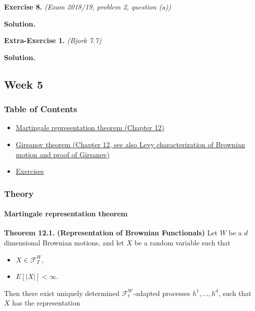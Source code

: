 \documentclass[
]{article}
\providecommand{\tightlist}{%
  \setlength{\itemsep}{0pt}\setlength{\parskip}{0pt}}
\begin{document}
\textbf{Exercise 8.} \emph{(Exam 2018/19, problem 2, question (a))}

\textbf{Solution.}

\textbf{Extra-Exercise 1.} \emph{(Bjork 7.7)}

\textbf{Solution.}

\hypertarget{week-5}{%
\subsection{Week 5}\label{week-5}}

\hypertarget{table-of-contents-4}{%
\subsubsection{Table of Contents}\label{table-of-contents-4}}

\begin{itemize}
\item
  \protect\hyperlink{martingale-representation-theorem}{Martingale
  representation theorem (Chapter 12)}
\item
  \protect\hyperlink{girsanov-theorem}{Girsanov theorem (Chapter 12, see
  also Levy characterization of Brownian motion and proof of Girsanov)}
\item
  \protect\hyperlink{exercises-week-5}{Exercises}
\end{itemize}

\hypertarget{theory-4}{%
\subsubsection{Theory}\label{theory-4}}

\hypertarget{martingale-representation-theorem}{%
\paragraph{Martingale representation
theorem}\label{martingale-representation-theorem}}

\textbf{Theorem 12.1.} \textbf{(Representation of Brownian Functionals)}
Let \(W\) be a \(d\) dimensional Brownian motions, and let \(X\) be a
random variable such that

\begin{itemize}
\tightlist
\item
  \(X\in\mathcal{F}^W_T\),
\item
  \(E[\vert X\vert]<\infty\).
\end{itemize}

Then there exist uniquely determined \(\mathcal{F}^W_t\)-adapted
processes \(h^1,...,h^d\), such that \(X\) has the representation
\end{document}
